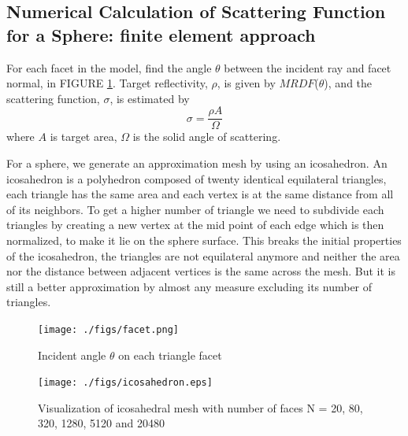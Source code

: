 \documentclass[11pt,reqno]{amsart}
\theoremstyle{definition}
\begin{document}
\subsection{Numerical Calculation of Scattering Function for a Sphere: finite element approach}
For each facet in the model, find the angle $\theta$ between the incident ray and facet normal, in FIGURE \ref{fig:facet}. Target reflectivity, $\rho$, is given by $MRDF$($\theta$), and the scattering function, $\sigma$, is estimated by
\begin{equation}
\sigma =\frac{\rho A}{\Omega}
\end{equation} 
where $A$ is target area, $\Omega$ is the solid angle of scattering.

For a sphere, we generate an approximation mesh by using an icosahedron. An icosahedron is a polyhedron composed of twenty identical equilateral triangles, each triangle has the same area and each vertex is at the same distance from all of its neighbors. To get a higher number of triangle we need to subdivide each triangles by creating a new vertex at the mid point of each edge which is then normalized, to make it lie on the sphere surface. This breaks the initial properties of the icosahedron, the triangles are not equilateral anymore and neither the area nor the distance between adjacent vertices is the same across the mesh. But it is still a better approximation by almost any measure excluding its number of triangles. 

\begin{figure}[H]  	
\centerline{\texttt{[image: ./figs/facet.png]}}
		\caption{Incident angle $\theta$ on each triangle facet}
        \label{fig:facet}
\end{figure}

\begin{figure}[H] 	\centerline{\texttt{[image: ./figs/icosahedron.eps]}}
		\caption{Visualization of icosahedral mesh with number of faces N = 20, 80, 320, 1280, 5120 and 20480}
        \label{fig:icosahedron}
\end{figure}
\end{document}
